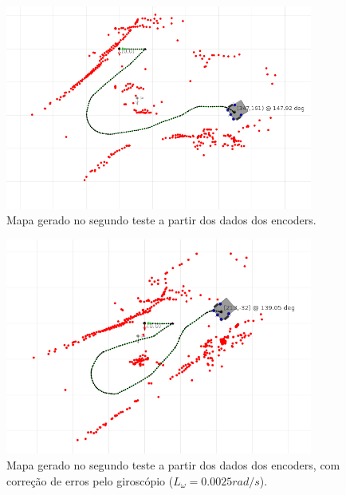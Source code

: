 \begin{figure}[H]
	\centering
	\includegraphics[width=0.9\textwidth]{./figuras/testes/teste2/mapa_encoders.png}
	\caption{Mapa gerado no segundo teste a partir dos dados dos encoders.}
	\label{fig:teste2_mapa_encoders}
\end{figure}

\begin{figure}[H]
	\centering
	\includegraphics[width=0.9\textwidth]{./figuras/testes/teste2/mapa_encoders_giro.png}
	\caption{Mapa gerado no segundo teste a partir dos dados dos encoders, com correção de erros pelo giroscópio ($L_\omega = 0.0025 \unit{rad/s}$).}
	\label{fig:teste2_mapa_encoders_giro}
\end{figure}

